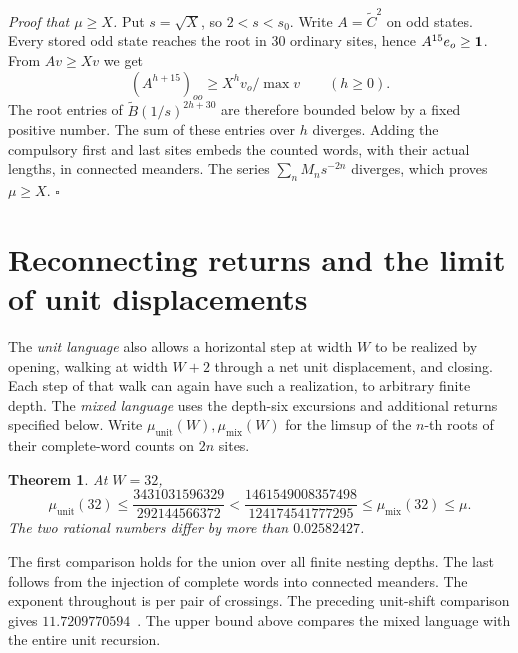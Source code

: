 \documentclass[11pt]{article}
\newenvironment{proof}[1][Proof]{\par\noindent\textit{#1.} }{\unskip\nobreak\hfill\hbox{$\square$}\par}
\newtheorem{theorem}{Theorem}
\newcommand{\unit}{\mathrm{unit}}\newcommand{\mix}{\mathrm{mix}}
\begin{document}
\begin{proof}[Proof that \(\mu\ge X\)]
Put \(s=\sqrt X\), so \(2<s<s_0\). Write \(A=\widetilde C^2\) on odd states. Every stored odd state reaches the root in 30 ordinary sites, hence \(A^{15}e_o\ge{\bf1}\). From \(Av\ge Xv\) we get
\[
       (A^{h+15})_{oo}\ge X^h v_o/\max v \qquad(h\ge0).
\]
The root entries of \(\widetilde B(1/s)^{2h+30}\) are therefore bounded below by a fixed positive number. The sum of these entries over \(h\) diverges. Adding the compulsory first and last sites embeds the counted words, with their actual lengths, in connected meanders. The series \(\sum_n M_n s^{-2n}\) diverges, which proves \(\mu\ge X\).
\end{proof}


\section{Reconnecting returns and the limit of unit displacements}\label{mixed}
The \emph{unit language} also allows a horizontal step at width \(W\) to be realized by opening, walking at width \(W+2\) through a net unit displacement, and closing. Each step of that walk can again have such a realization, to arbitrary finite depth. The \emph{mixed language} uses the depth-six excursions and additional returns specified below. Write \(\mu_{\unit}(W),\mu_{\mix}(W)\) for the limsup of the \(n\)-th roots of their complete-word counts on \(2n\) sites.

\begin{theorem}\label{separation}
At \(W=32\),
\[
 \mu_{\unit}(32)\le \frac{3431031596329}{292144566372}
 <\frac{1461549008357498}{124174541777295}\le\mu_{\mix}(32)\le\mu .
\]
The two rational numbers differ by more than \(0.02582427\).
\end{theorem}
The first comparison holds for the union over all finite nesting depths. The last follows from the injection of complete words into connected meanders. The exponent throughout is per pair of crossings. The preceding unit-shift comparison gives \(11.7209770594\)~\cite{arg}. The upper bound above compares the mixed language with the entire unit recursion.
\end{document}
